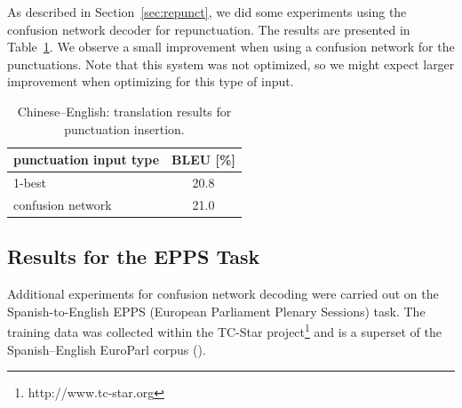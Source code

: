 \documentclass[10pt]{report}
\theoremstyle{plain}
\begin{document}
{As described in Section~\ref{sec:repunct}, we did some experiments using the confusion network decoder for repunctuation.
The results are presented in Table~\ref{tab-ce-pm}.
We observe a small improvement when using a confusion network for the punctuations.
Note that this system was not optimized, so we might expect larger improvement when optimizing for this type of input.
\begin{table}[t]
\begin{center}
\caption{Chinese--English: translation results for punctuation insertion.} \label{tab-ce-pm}
\begin{tabular}{|l|c|}
\hline
punctuation input type & BLEU [\%]  \\ \hline
1-best & 20.8   \\  \hline
confusion network & 21.0  \\ 
\hline
\end{tabular}
\end{center}
\end{table}

	
\subsection{Results for the EPPS Task}
Additional experiments for confusion network decoding were carried out on the Spanish-to-English EPPS (European Parliament Plenary Sessions) task.
The training data was collected within the TC-Star project\footnote{http://www.tc-star.org} and is a superset of the Spanish--English EuroParl corpus (\cite{koehn:europarl:mtsummit:2005}).


}
\end{document}
